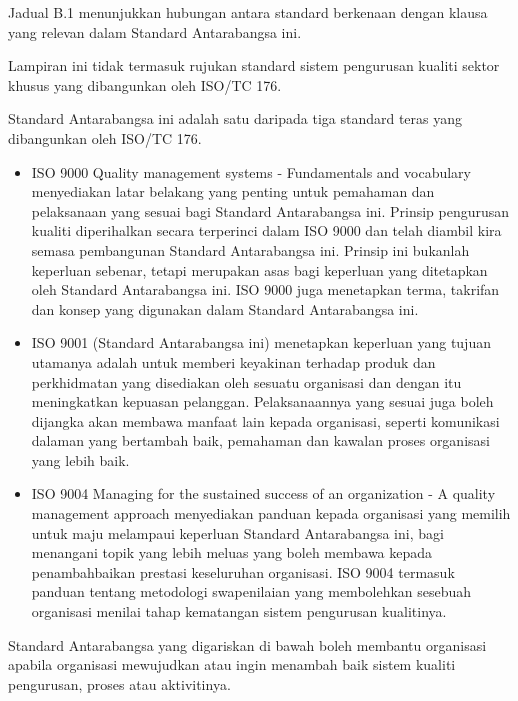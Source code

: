 \documentclass[
]{article}
\providecommand{\tightlist}{%
  \setlength{\itemsep}{0pt}\setlength{\parskip}{0pt}}
\begin{document}
Jadual B.1 menunjukkan hubungan antara standard berkenaan dengan klausa
yang relevan dalam Standard Antarabangsa ini.

Lampiran ini tidak termasuk rujukan standard sistem pengurusan kualiti
sektor khusus yang dibangunkan oleh ISO/TC 176.

Standard Antarabangsa ini adalah satu daripada tiga standard teras yang
dibangunkan oleh ISO/TC 176.

\begin{itemize}
\tightlist
\item
  ISO 9000 Quality management systems - Fundamentals and vocabulary
  menyediakan latar belakang yang penting untuk pemahaman dan
  pelaksanaan yang sesuai bagi Standard Antarabangsa ini. Prinsip
  pengurusan kualiti diperihalkan secara terperinci dalam ISO 9000 dan
  telah diambil kira semasa pembangunan Standard Antarabangsa ini.
  Prinsip ini bukanlah keperluan sebenar, tetapi merupakan asas bagi
  keperluan yang ditetapkan oleh Standard Antarabangsa ini. ISO 9000
  juga menetapkan terma, takrifan dan konsep yang digunakan dalam
  Standard Antarabangsa ini.
\item
  ISO 9001 (Standard Antarabangsa ini) menetapkan keperluan yang tujuan
  utamanya adalah untuk memberi keyakinan terhadap produk dan
  perkhidmatan yang disediakan oleh sesuatu organisasi dan dengan itu
  meningkatkan kepuasan pelanggan. Pelaksanaannya yang sesuai juga boleh
  dijangka akan membawa manfaat lain kepada organisasi, seperti
  komunikasi dalaman yang bertambah baik, pemahaman dan kawalan proses
  organisasi yang lebih baik.
\item
  ISO 9004 Managing for the sustained success of an organization - A
  quality management approach menyediakan panduan kepada organisasi yang
  memilih untuk maju melampaui keperluan Standard Antarabangsa ini, bagi
  menangani topik yang lebih meluas yang boleh membawa kepada
  penambahbaikan prestasi keseluruhan organisasi. ISO 9004 termasuk
  panduan tentang metodologi swapenilaian yang membolehkan sesebuah
  organisasi menilai tahap kematangan sistem pengurusan kualitinya.
\end{itemize}

Standard Antarabangsa yang digariskan di bawah boleh membantu organisasi
apabila organisasi mewujudkan atau ingin menambah baik sistem kualiti
pengurusan, proses atau aktivitinya.
\end{document}

